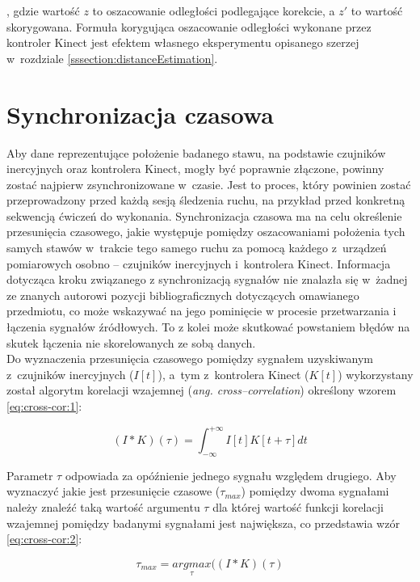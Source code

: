 , gdzie wartość $z$ to oszacowanie odległości podlegające korekcie, a $z'$ to wartość skorygowana. Formuła korygująca oszacowanie odległości wykonane przez kontroler Kinect jest efektem własnego eksperymentu opisanego szerzej w~rozdziale \ref{sssection:distanceEstimation}.
										
\section{Synchronizacja czasowa}
										
Aby dane reprezentujące położenie badanego stawu, na podstawie czujników inercyjnych oraz kontrolera Kinect, mogły być poprawnie złączone, powinny zostać najpierw zsynchronizowane w~czasie. Jest to proces, który powinien zostać przeprowadzony przed każdą sesją śledzenia ruchu, na przykład przed konkretną sekwencją ćwiczeń do wykonania. Synchronizacja czasowa ma na celu określenie przesunięcia czasowego, jakie występuje pomiędzy oszacowaniami położenia tych samych stawów w~trakcie tego samego ruchu za pomocą każdego z~urządzeń pomiarowych osobno -- czujników inercyjnych i~kontrolera Kinect. Informacja dotycząca kroku związanego z synchronizacją sygnałów nie znalazła się w~żadnej ze znanych autorowi pozycji bibliograficznych dotyczących omawianego przedmiotu, co może wskazywać na jego pominięcie w procesie przetwarzania i łączenia sygnałów źródłowych. To z kolei może skutkować powstaniem błędów na skutek łączenia nie skorelowanych ze sobą danych.\\
Do wyznaczenia przesunięcia czasowego pomiędzy sygnałem uzyskiwanym z~czujników inercyjnych ($I[t]$), a~tym z~kontrolera Kinect ($K[t]$) wykorzystany został algorytm korelacji wzajemnej (\emph{ang. cross--correlation}) określony wzorem \ref{eq:cross-cor:1}:

\begin{equation}
	(I \ast K)(\tau) = \int_{-\infty}^{+\infty}I[t]K[t+\tau]dt
	\label{eq:cross-cor:1}
\end{equation}

Parametr $\tau$ odpowiada za opóźnienie jednego sygnału względem drugiego. Aby wyznaczyć jakie jest przesunięcie czasowe ($\tau_{max}$) pomiędzy dwoma sygnałami należy znaleźć taką wartość argumentu $\tau$ dla której wartość funkcji korelacji wzajemnej pomiędzy badanymi sygnałami jest największa, co przedstawia wzór \ref{eq:cross-cor:2}:										
										
\begin{equation}
	\tau_{max}       = \underset{\tau}{argmax}((I \ast K)(\tau)
	\label{eq:cross-cor:2} 
\end{equation}

